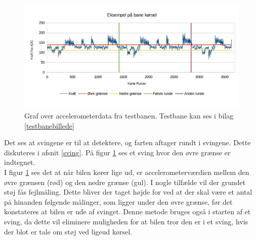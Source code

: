 \begin{figure}[h!]
\centering
\includegraphics[scale=0.25]{./Graphics/banekorsel}
\caption{Graf over accelerometerdata fra testbanen. Testbane kan ses i bilag \ref{testbanebillede}}
\label{testbanegraf}
\end{figure}

Det ses at svingene er til at detektere, og farten aftager rundt i svingene. Dette diskuteres i afsnit \ref{sving}. På figur \ref{testbanegraf} ses et sving hvor den øvre grænse er indtegnet.\\

I figur \ref{testbanegraf} ses det at når bilen kører lige ud, er accelerometerværdien mellem den øvre grænsen (rød) og den nedre grænse (gul). I nogle tilfælde vil der grundet støj fås fejlmåling. Dette bliver der taget højde for ved at der skal være et antal på hinanden følgende målinger, som ligger under den øvre grænse, før det konstateres at bilen er ude af svinget. Denne metode bruges også i starten af et sving, da dette vil eliminere muligheden for at bilen tror den er i et sving, hvis der blot er tale om støj ved ligeud kørsel.\\



